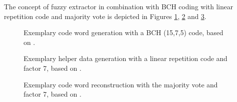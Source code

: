 The concept of fuzzy extractor in combination with BCH coding with linear repetition code and majority vote is depicted in Figures \ref{img:4_BCH_concept}, \ref{img:4_LR_HD} and \ref{img:4_MV_codewords}.\pagebreak

\begin{figure}[h]
\centering
{}
\caption{Exemplary code word generation with a BCH (15,7,5) code, based on \cite{10}.}
\label{img:4_BCH_concept}
\end{figure}

\begin{figure}[h]
\centering
{}
\caption{Exemplary helper data generation with a linear repetition code and factor 7, based on \cite{10}.}
\label{img:4_LR_HD}
\end{figure}

\begin{figure}[h]
\centering
{}
\caption{Exemplary code word reconstruction with the majority vote and factor 7, based on \cite{10}.}
\label{img:4_MV_codewords}
\end{figure}


